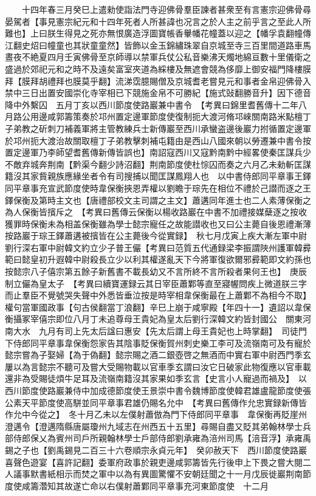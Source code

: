 　　十四年春三月癸巳上遣勑使詣法門寺迎佛骨羣臣諫者甚衆至有言憲宗迎佛骨尋晏駕者【事見憲宗紀元和十四年死者人所甚諱也况言之於人主之前乎言之至此人所難也】上曰朕生得見之死亦無恨廣造浮圖寶帳香轝幡花幢蓋以迎之【幡孚袁翻幢傳江翻史炤曰幢童也其狀童童然】皆飾以金玉錦繡珠翠自京城至寺三百里間道路車馬晝夜不絶夏四月壬寅佛骨至京師導以禁軍兵仗公私音樂沸天燭地綿亘數十里儀衛之盛過於郊祀元和之時不及遠矣富室夾道為綵樓及無遮會競為侈靡上御安福門降樓膜拜【膜拜胡禮拜也膜莫乎翻】流涕霑臆賜僧及京城耆老嘗見元和事者金帛迎佛骨入禁中三日出置安國崇化寺宰相已下競施金帛不可勝紀【施式䜴翻勝音升】因下德音降中外繫囚　五月丁亥以西川節度使路巖兼中書令　【考異曰錦里耆舊傳十二年八月路公用邊咸郭籌策奏於邛州置定邊軍節度使復制扼大渡河脩邛崍關南路米點檀丁子弟教之斫刺刀補義軍將主管教練兵士新傳巖至西川承蠻盗邊後巖力拊循置定邊軍於邛州扼大渡治故關取檀丁子弟教擊刺補屯籍由是西山八國來朝以勞遷兼中書令按置定邊軍乃李師望耆舊傳新傳皆誤也】南詔寇西川又寇黔南黔中經畧使秦匡謀兵少不敵弃城奔荆南【黔渠今翻少詩沼翻】荆南節度使杜悰囚而奏之六月乙未勑斬匡謀籍沒其家貲親族應緣坐者令有司搜捕以聞匡謀鳳翔人也　以中書侍郎同平章事王鐸同平章事充宣武節度使時韋保衡挾恩弄權以劉瞻于琮先在相位不禮於己譛而逐之王鐸保衡及第時主文也【唐禮部校文主司謂之主文】蕭遘同年進士也二人素薄保衡之為人保衡皆擯斥之　【考異曰舊傳云保衡以楊收路巖在中書不加禮接媒蘖逐之按收獲罪時保衡未為相盖保衡雖為學士懿宗寵任之故能譛收也又曰公主薨自後恩禮漸薄按路巖于琮王鐸蕭遘被擯皆在公主薨後今從實録】　秋七月戊寅上疾大漸左軍中尉劉行深右軍中尉韓文約立少子普王儼【考異曰范質五代通録梁李振謂陜州護軍韓彛範曰懿皇初升遐韓中尉殺長立少以利其權遂亂天下今將軍復欲爾邪彛範即文約孫也按懿宗八子僖宗第五餘子新舊書不載長幼又不言所終不言所殺者果何王也】　庚辰制立儼為皇太子　【考異曰續寶運録云其日宰臣蕭鄴等直至寢幄問疾上微道朕三字而止羣臣不覺號哭失聲中外悉皆垂泣按是時宰相韋保衡最在上蕭鄴不為相今不取】權句當軍國政事【句古侯翻當丁浪翻】辛巳上崩于咸寧殿【年四十一】遺詔以韋保衡攝冢宰僖宗即位八月丁未追尊母王貴妃為皇太后劉行深韓文約皆封國公　關東河南大水　九月有司上先太后諡曰惠安【先太后謂上母王貴妃也上時掌翻】　司徒門下侍郎同平章事韋保衡怨家告其陰事貶保衡賀州刺史樂工李可及流嶺南可及有寵於懿宗嘗為子娶婦【為于偽翻】懿宗賜之酒二銀壺啓之無酒而中實右軍中尉西門季玄屢以為言懿宗不聽可及嘗大受賜物載以官車季玄謂曰汝它日破家此物復應以官車載還非為受賜徒煩牛足耳及流嶺南籍沒其家果如季玄言【史言小人寵過而禍及】　以西川節度使路巖兼侍中加成德節度使王景崇中書令魏博節度使韓君雄盧龍節度使張公素天平節度使高駢並同平章事君雄仍賜名允中　【考異曰舊傳作允忠實録新傳皆作允中今從之】　冬十月乙未以左僕射蕭倣為門下侍郎同平章事　韋保衡再貶崖州澄邁令【澄邁隋縣唐屬瓊州九域志在州西五十五里】尋賜自盡又貶其弟翰林學士兵部侍郎保乂為賓州司戶所親翰林學士戶部侍郎劉承雍為涪州司馬【涪音浮】承雍禹錫之子也【劉禹錫見二百三十六卷順宗永貞元年】　癸卯赦天下　西川節度使路巖喜聲色遊宴【喜許記翻】委軍府政事於親吏邊咸郭籌皆先行後申上下畏之嘗大閱二人議事默書紙相示而焚之軍中以為有異圖驚懼不安朝廷聞之十一月戊辰徙巖荆南節度使咸籌濳知其故遂亡命以右僕射蕭鄴同平章事充河東節度使　十二月


